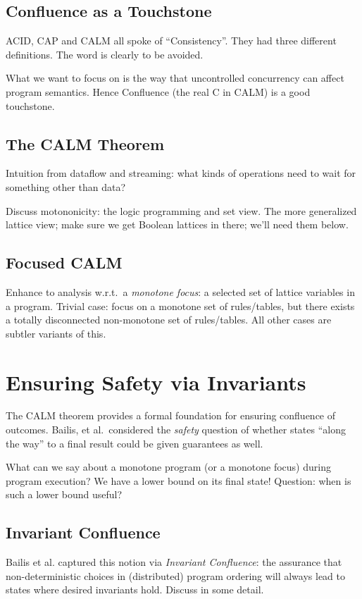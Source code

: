 \documentclass{sig-alternate}
\begin{document}
\subsection{Confluence as a Touchstone}
ACID, CAP and CALM all spoke of ``Consistency''.  They had three different definitions.  The word is clearly to be avoided.

What we want to focus on is the way that uncontrolled concurrency can affect program semantics.  Hence Confluence (the real C in CALM) is a good touchstone.

\subsection{The CALM Theorem}
Intuition from dataflow and streaming: what kinds of operations need to wait for something other than data?

Discuss motononicity: the logic programming and set view.  The more generalized lattice view; make sure we get Boolean lattices in there; we'll need them below.

\subsection{Focused CALM}

Enhance to analysis w.r.t.\ a \emph{monotone focus}: a selected set of lattice variables in a program.  Trivial case: focus on a monotone set of rules/tables, but there exists a totally disconnected non-monotone set of rules/tables.  All other cases are subtler variants of this.

\section{Ensuring Safety via Invariants}

The CALM theorem provides a formal foundation for ensuring confluence of outcomes.  Bailis, et al.~considered the \emph{safety} question of whether states ``along the way'' to a final result could be given guarantees as well.

What can we say about a monotone program (or a monotone focus) during program execution?  We have a lower bound on its final state!  Question: when is such a lower bound useful?

\subsection{Invariant Confluence}
Bailis et al. captured this notion via \emph{Invariant Confluence}: the assurance that non-deterministic choices in (distributed) program ordering will always lead to states where desired invariants hold.  Discuss in some detail.
\end{document}

